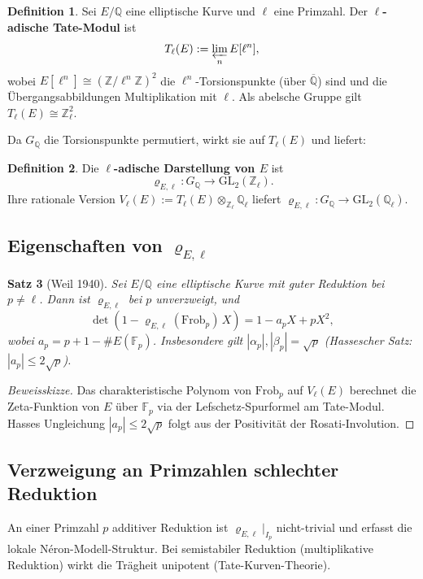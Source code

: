 \documentclass[a4paper,12pt]{amsart}
\newtheorem{theorem}{Satz}[section]
\theoremstyle{definition}
\newtheorem{definition}[theorem]{Definition}
\theoremstyle{remark}
\newcommand{\Q}{\mathbb{Q}}
\newcommand{\Z}{\mathbb{Z}}
\newcommand{\Zl}{\mathbb{Z}_\ell}
\newcommand{\Ql}{\mathbb{Q}_\ell}
\newcommand{\Fp}{\mathbb{F}_p}
\newcommand{\Qbar}{\overline{\mathbb{Q}}}
\newcommand{\GL}{\mathrm{GL}}
\newcommand{\Frob}{\mathrm{Frob}}
\newcommand{\Tl}{T_\ell}
\begin{document}
\begin{definition}
Sei $E/\Q$ eine elliptische Kurve und $\ell$ eine Primzahl. Der
\textbf{$\ell$-adische Tate-Modul} ist
\[
  \Tl(E) := \varprojlim_n E[\ell^n],
\]
wobei $E[\ell^n] \cong (\Z/\ell^n\Z)^2$ die $\ell^n$-Torsionspunkte (über $\Qbar$)
sind und die Übergangsabbildungen Multiplikation mit $\ell$. Als abelsche Gruppe gilt
$\Tl(E) \cong \Zl^2$.
\end{definition}

Da $G_\Q$ die Torsionspunkte permutiert, wirkt sie auf $\Tl(E)$ und liefert:

\begin{definition}
Die \textbf{$\ell$-adische Darstellung von $E$} ist
\[
  \varrho_{E,\ell}\colon G_\Q \to \GL_2(\Zl).
\]
Ihre rationale Version $V_\ell(E) := \Tl(E) \otimes_{\Zl} \Ql$ liefert
$\varrho_{E,\ell}\colon G_\Q \to \GL_2(\Ql)$.
\end{definition}

\subsection{Eigenschaften von $\varrho_{E,\ell}$}

\begin{theorem}[Weil 1940]
\label{satz:weil-hasse}
Sei $E/\Q$ eine elliptische Kurve mit guter Reduktion bei $p \neq \ell$.
Dann ist $\varrho_{E,\ell}$ bei $p$ unverzweigt, und
\[
  \det(1 - \varrho_{E,\ell}(\Frob_p)\,X) = 1 - a_p X + p X^2,
\]
wobei $a_p = p + 1 - \#E(\Fp)$. Insbesondere gilt
$|\alpha_p|, |\beta_p| = \sqrt{p}$ (Hassescher Satz: $|a_p| \leq 2\sqrt{p}$).
\end{theorem}

\begin{proof}[Beweisskizze]
Das charakteristische Polynom von $\Frob_p$ auf $V_\ell(E)$ berechnet die
Zeta-Funktion von $E$ über $\Fp$ via der Lefschetz-Spurformel am Tate-Modul.
Hasses Ungleichung $|a_p| \leq 2\sqrt{p}$ folgt aus der Positivität der
Rosati-Involution.
\end{proof}

\subsection{Verzweigung an Primzahlen schlechter Reduktion}

An einer Primzahl $p$ additiver Reduktion ist $\varrho_{E,\ell}|_{I_p}$ nicht-trivial
und erfasst die lokale Néron-Modell-Struktur. Bei semistabiler Reduktion
(multiplikative Reduktion) wirkt die Trägheit unipotent (Tate-Kurven-Theorie).
\end{document}
